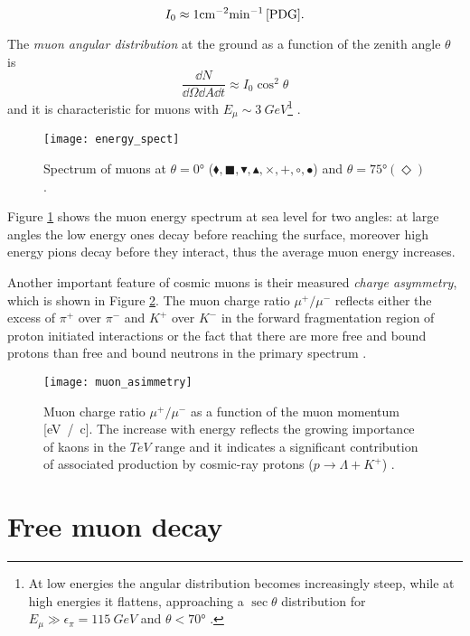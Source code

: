 \begin{equation}
\label{mu-rate}
I_0 \approx 1 \si{cm^{-2}} \si{min^{-1}}  \, \cite{PDG} .
\end{equation}

The \emph{muon angular distribution} at the ground as a function of the zenith angle $\theta$ is
\begin{equation} \label{dist}
\frac{\dd N}{\dd \Omega \dd A \dd t} \approx I_0 \cos^2 \theta
\end{equation}
and it is characteristic for muons with $E_{\mu} \sim \SI{3}{GeV}$\footnote{At low energies the angular distribution becomes increasingly steep, while at high energies it flattens, approaching a $\sec \theta$ distribution for $E_{\mu} \gg \epsilon_{\pi} = \SI{115}{GeV}$ and $\theta < \ang{70}$ \cite{PDG}.} \cite{PDG}.
\begin{figure}[!h] 
	\centering
	\texttt{[image: energy\_spect]} 
	\caption{Spectrum of muons at $\theta = \ang{0}$ ($\blacklozenge , \blacksquare , \blacktriangledown , \blacktriangle , \times , + , \circ, \bullet$) and  $\theta = \ang{75} (\Diamond) $ \cite{PDG}.} \label{energy_spect}
\end{figure}

Figure \ref{energy_spect} shows the muon energy spectrum at sea level for two angles: at large angles the low energy ones decay before reaching the surface, moreover high energy pions decay before they interact, thus the average muon energy increases.

Another important feature of cosmic muons is their measured \emph{charge asymmetry}, which is shown in Figure \ref{muon_asimmetry}. The muon charge ratio $\mu^+ / \mu^-$ reflects either the excess of $\pi^+$ over  $\pi^-$ and
$K^+$ over  $K^-$ in the forward fragmentation region of proton initiated
interactions or the fact that there are more free and bound
protons than free and bound neutrons in the primary spectrum \cite{PDG}. 

\begin{figure}[!h]
	\centering
	\texttt{[image: muon\_asimmetry]} 
	\caption{Muon charge ratio $\mu^+ / \mu^-$ as a function of the muon momentum [\si{eV / c}]. The increase with energy reflects the growing importance of kaons in the $\si{TeV}$ range and it indicates a significant contribution of associated production by cosmic-ray protons ($p \rightarrow \Lambda + K^+ $) \cite{PDG}.} \label{muon_asimmetry}
\end{figure}


\section{Free muon decay}


